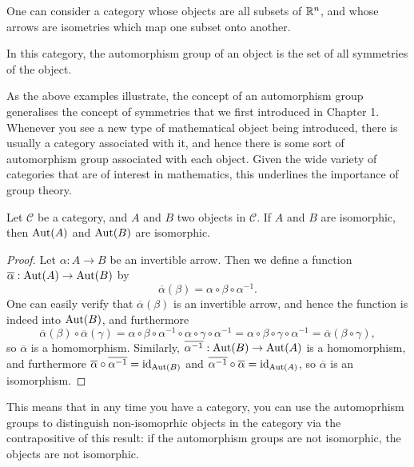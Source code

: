 \begin{example}\label{eg:symmetrycategory}
  One can consider a category whose objects are all subsets of $\mathbb{R}^{n}$,
  and whose arrows are isometries which map one subset onto another.
  
  In this category, the automorphism group of an object is the set of all
  symmetries of the object.
\end{example}

As the above examples illustrate, the concept of an automorphism group
generalises the concept of symmetries that we first introduced in Chapter 1.
Whenever you see a new type of mathematical object being introduced, there
is usually a category associated with it, and hence there is some sort of
automorphism group associated with each object.  Given the wide variety of categories
that are of interest in mathematics, this underlines the importance of group
theory.

\begin{proposition}
  Let $\mathcal{C}$ be a category, and $A$ and $B$ two objects in
  $\mathcal{C}$.  If $A$ and $B$ are isomorphic, then $\operatorname{Aut}(A)$ and
  $\operatorname{Aut}(B)$ are isomorphic.
\end{proposition}
\begin{proof}
  Let $\alpha: A \to B$ be an invertible arrow.  Then we define a function
  $\overline{\alpha} : \operatorname{Aut}(A) \to \operatorname{Aut}(B)$ by
  \[
    \overline{\alpha}(\beta) = \alpha \circ \beta \circ \alpha^{-1}.
  \]
  One can easily verify that $\overline{\alpha}(\beta)$ is an
  invertible arrow, and hence the function is indeed into $\operatorname{Aut}(B)$, and
  furthermore
  \[
    \overline{\alpha}(\beta) \circ \overline{\alpha}(\gamma) = \alpha \circ \beta \circ
      \alpha^{-1} \circ \alpha \circ \gamma \circ \alpha^{-1} = \alpha \circ \beta
      \circ \gamma \circ \alpha^{-1} = \overline{\alpha}(\beta \circ \gamma),
  \]
  so $\overline{\alpha}$ is a homomorphism.  Similarly,
  $\overline{\alpha^{-1}} : \operatorname{Aut}(B) \to \operatorname{Aut}(A)$ is a homomorphism, and
  furthermore $\overline{\alpha} \circ \overline{\alpha^{-1}} =
  \text{id}_{\operatorname{Aut}(B)}$ and $\overline{\alpha^{-1}} \circ \overline{\alpha} =
  \text{id}_{\operatorname{Aut}(A)}$, so $\overline{\alpha}$ is an isomorphism.
\end{proof}

This means that in any time you have a category, you can use the automoprhism
groups to distinguish non-isomoprhic objects in the category via the
contrapositive of this result: if the automorphism groups are not
isomorphic, the objects are not isomorphic.

